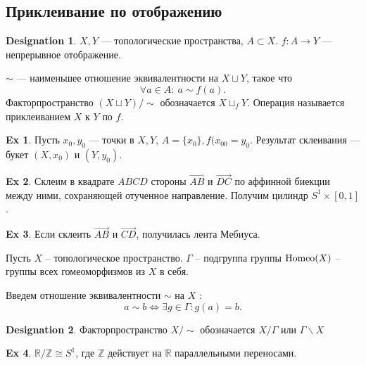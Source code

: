 \documentclass[11pt]{book}
\newcommand{\Z}{\mathbb{Z}}
\newcommand{\R}{\mathbb{R}}
\theoremstyle{definition}
\theoremstyle{plain}
\theoremstyle{plain}
\theoremstyle{definition}
\newtheorem*{ex}{Ex}
\newtheorem*{name}{Designation}
\theoremstyle{remark}
\begin{document}
\subsection{Приклеивание по отображению}
\begin{name}
    $ X, Y$ ---  топологические пространства, $ A \subset X$.
    $ f: A \to  Y$ --- непрерывное отображение.
\end{name}
\begin{defn}
    $ \sim $ --- наименьшее отношение эквивалентности на $ X \sqcup Y$, такое что \[
	\forall a \in  A: ~a \sim f(a)
    .\]
    Факторпространство $ (X \sqcup Y) / \!\sim $ обозначается $ X \sqcup_f Y$. Операция называется приклеиванием  $ X$ к  $ Y$ по  $ f$.
\end{defn}
\begin{ex}
    Пусть $ x_0, y_0$ --- точки в $ X, Y$,  $ A = \{x_0\}, f(x_{00} = y_0$.
    Результат склеивания --- {\sf букет} $ (X, x_0)$ и $(Y, y_0)$.
\end{ex}
\begin{ex}
    Склеим в квадрате $ ABCD$ стороны  $\overrightarrow{AB}$ и $ \overrightarrow{DC}$ по аффинной биекции между ними, сохраняющей отученное направление. Получим цилиндр $ S^{1} \times [0, 1]$.
\end{ex}
\begin{ex}
    Если склеить $ \overrightarrow{AB}$ и $ \overrightarrow{CD}$, получилась  { \sf лента Мебиуса}.
\end{ex}
\begin{defn}
    Пусть $ X $ -- топологическое пространство. $ \Gamma$ -- подгруппа группы $ {\rm Homeo}(X)$ -- группы всех гомеоморфизмов из $ X$ в себя.

    Введем отношение эквивалентности $ \sim $ на $ X$ :
    \[
	a \sim b \Longleftrightarrow \exists  g \in  \Gamma : g(a) = b
    .\]
    \begin{name}
	Факторпространство $ X /\sim $  обозначается $ X / \Gamma$ или $ \Gamma \backslash X$
    \end{name}
\end{defn}
\begin{ex}
    $ \R / \Z \cong S^{1}$, где $ \Z$ действует на $ \R$  параллельными переносами.
\end{ex}
\end{document}
